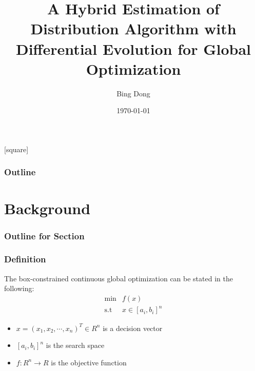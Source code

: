 \documentclass[xcolor=dvipsnames]{beamer}
\begin{document}
    \title[SSCI]{A Hybrid Estimation of Distribution Algorithm with Differential Evolution for Global Optimization}
    \author{Bing Dong}
    \date{\today}
    \begin{frame}
        \titlepage
    \end{frame}
    [square]
    \begin{frame}
        \frametitle{Outline}
        \tableofcontents
    \end{frame}

    \section{Background}
    \begin{frame}
      \frametitle{Outline for Section \thesection}
      \tableofcontents[currentsection]
    \end{frame}
    
    \begin{frame}
    \frametitle{Definition}
    The box-constrained continuous global optimization can be stated in the following:
    \begin{equation}
    \begin{array}{rl}
    \mbox{min} & f(x)\\
    \mbox{s.t} & x\in[a_i,b_i]^n
    \end{array}
    \label{MOP}
    \end{equation}

    \begin{itemize}
    \item $x=(x_1, x_2, \cdots, x_n)^T\in{R^n}$ is a decision vector
    \item $[a_i, b_i]^n$ is the search space
    \item $f:R^n\to{R}$ is the objective function
    \end{itemize}
    \end{frame}
\end{document}
